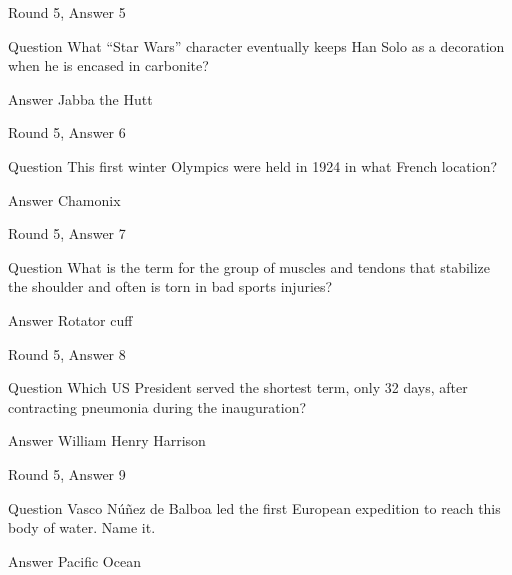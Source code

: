 \documentclass[11pt]{beamer}
\begin{document}
\begin{frame}[t]{Round 5, Answer 5}
\vspace{2em}
\begin{block}{Question}
What ``Star Wars'' character eventually keeps Han Solo as a decoration when he is encased in carbonite\@?
\end{block}
\pause{}
\begin{block}{Answer}
Jabba the Hutt
\end{block}
\end{frame}
    

\begin{frame}[t]{Round 5, Answer 6}
\vspace{2em}
\begin{block}{Question}
This first winter Olympics were held in 1924 in what French location\@?
\end{block}
\pause{}
\begin{block}{Answer}
Chamonix
\end{block}
\end{frame}
    

\begin{frame}[t]{Round 5, Answer 7}
\vspace{2em}
\begin{block}{Question}
What is the term for the group of muscles and tendons that stabilize the shoulder and often is torn in bad sports injuries\@?
\end{block}
\pause{}
\begin{block}{Answer}
Rotator cuff
\end{block}
\end{frame}
    

\begin{frame}[t]{Round 5, Answer 8}
\vspace{2em}
\begin{block}{Question}
Which US President served the shortest term, only 32 days, after contracting pneumonia during the inauguration\@?
\end{block}
\pause{}
\begin{block}{Answer}
William Henry Harrison
\end{block}
\end{frame}
    

\begin{frame}[t]{Round 5, Answer 9}
\vspace{2em}
\begin{block}{Question}
Vasco Núñez de Balboa led the first European expedition to reach this body of water. Name it.
\end{block}
\pause{}
\begin{block}{Answer}
Pacific Ocean
\end{block}
\end{frame}
    
\end{document}
